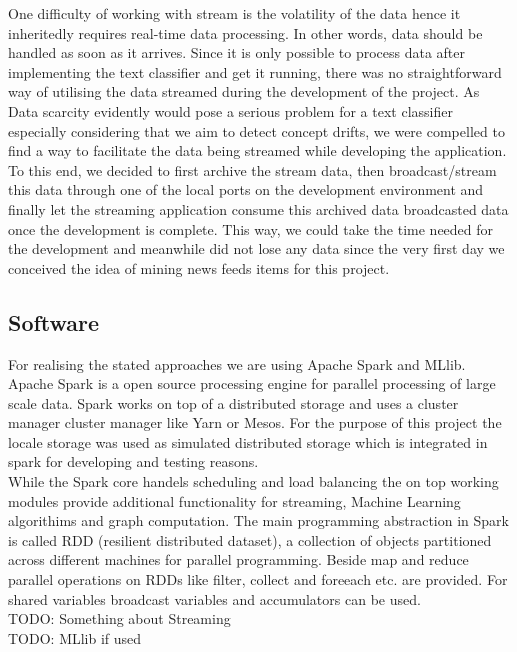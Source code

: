 \documentclass[12pt]{article}
\begin{document}
    


One difficulty of working with stream is the volatility of the data hence it inheritedly requires real-time data processing. In other words,  data should be handled as soon as it arrives. Since it is only possible to process data after implementing the text classifier and get it running, there was no straightforward way of utilising the data streamed during the development of the project. As Data scarcity evidently would pose a serious problem for a text classifier especially considering that we aim to detect concept drifts, we were compelled to find a way to facilitate the data being streamed while developing the application. To this end, we decided to first archive the stream data, then broadcast/stream this data through one of the local ports on the development environment and finally let the streaming application consume this archived data broadcasted data once the development is complete. This way, we could take the time needed for the development and meanwhile did not lose any data since the very first day we conceived the idea of mining news feeds items for this project.
\subsection{Software}
For realising the stated approaches we are using Apache Spark and MLlib. Apache Spark is a open source processing engine for parallel processing of large scale data. Spark works on top of a distributed storage and uses a cluster manager cluster manager like Yarn or Mesos. For the purpose of this project the locale storage was used as simulated distributed storage which is integrated in spark for developing and testing reasons.  \\
While the Spark core handels scheduling and load balancing the on top working modules provide additional functionality for streaming, Machine Learning  algorithims and graph computation. The main programming abstraction in Spark is called RDD (resilient distributed dataset), a collection of objects partitioned across different machines for parallel programming. Beside map and reduce parallel operations on RDDs like filter, collect and foreeach etc. are provided. For shared variables broadcast variables and  accumulators can be used.
\\ 
TODO: Something about Streaming
\\
TODO: MLlib if used
\end{document}
